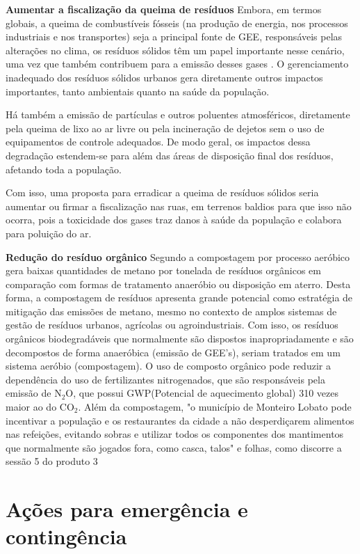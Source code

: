 \textbf{Aumentar a fiscalização da queima de resíduos}
Embora, em termos globais, a queima de combustíveis fósseis (na produção de energia, nos processos industriais e nos transportes) seja a principal fonte de GEE, responsáveis pelas alterações no clima, os resíduos sólidos têm um papel importante nesse cenário, uma vez que também contribuem para a emissão desses gases \cite{IPCC_2008}. O gerenciamento inadequado dos resíduos sólidos urbanos gera diretamente outros impactos importantes, tanto ambientais quanto na saúde da população. \cite{WHO_Europe_2007}

Há também a emissão de partículas e outros poluentes atmosféricos, diretamente pela queima de lixo ao ar livre ou pela incineração de dejetos sem o uso de equipamentos de controle adequados. De modo geral, os impactos dessa degradação estendem-se para além das áreas de disposição final dos resíduos, afetando toda a população.\cite{Gouveia_riscogee_2010}

Com isso, uma proposta para erradicar a queima de resíduos sólidos  seria aumentar ou firmar a fiscalização nas ruas, em terrenos baldios para que isso não ocorra, pois a toxicidade dos gases  traz danos à saúde da população e colabora para poluição do ar.

\textbf{Redução do resíduo orgânico}
Segundo \cite{Inacio2010} a compostagem por processo aeróbico gera baixas quantidades de metano por tonelada de resíduos orgânicos em comparação com formas de tratamento anaeróbio ou disposição em aterro. Desta forma, a compostagem de resíduos apresenta grande potencial como estratégia de mitigação das emissões de metano, mesmo no contexto de amplos sistemas de gestão de resíduos urbanos, agrícolas ou agroindustriais.
Com isso, os resíduos orgânicos biodegradáveis que normalmente são dispostos inapropriadamente e são decompostos de forma anaeróbica (emissão de GEE’s), seriam tratados em um sistema aeróbio (compostagem). O uso de composto orgânico pode reduzir a dependência do uso de fertilizantes nitrogenados, que são responsáveis pela emissão de N$_{2}$O, que possui GWP(Potencial de aquecimento global) 310 vezes maior ao do CO$_{2}$. \cite{IPCC_2008}
Além da compostagem, "o município de Monteiro Lobato pode incentivar a população e os restaurantes da cidade a não desperdiçarem alimentos nas refeições, evitando sobras e utilizar todos os componentes dos mantimentos que normalmente são jogados fora, como casca, talos" e folhas, como discorre a sessão 5 do produto 3


\FloatBarrier
\newpage
\section{Ações para emergência e contingência}
\label{sec:emerg_corr}

